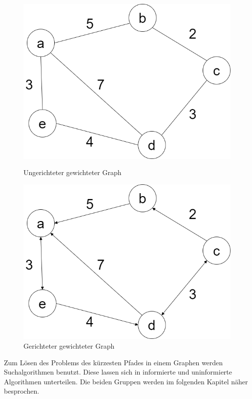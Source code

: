 \begin{figure}[H]
	\centering
	\begin{minipage}[b]{0.45\textwidth}
		\includegraphics[width=\linewidth]{images/undirGraph.png}
		\caption{Ungerichteter gewichteter Graph}
		\label{fig:undirGraph}
	\end{minipage}
	\hfill
	\begin{minipage}[b]{0.45\textwidth}
		\includegraphics[width=\linewidth]{images/dirGraph.png}
		\caption{Gerichteter gewichteter Graph}
		\label{fig:dirGraph}
	\end{minipage}
\end{figure}

Zum Lösen des Problems des kürzesten Pfades in einem Graphen werden Suchalgorithmen benutzt. Diese lassen sich in informierte und uninformierte Algorithmen unterteilen. Die beiden Gruppen werden im folgenden Kapitel näher besprochen.

